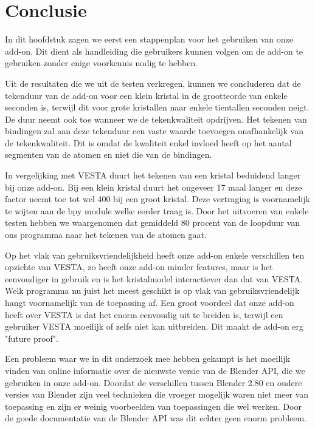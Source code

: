 \section{Conclusie}
In dit hoofdstuk zagen we eerst een stappenplan voor het gebruiken van onze add-on. Dit dient als handleiding die gebruikers kunnen volgen om de add-on te gebruiken zonder enige voorkennis nodig te hebben. 
\par
Uit de resultaten die we uit de testen verkregen, kunnen we concluderen dat de tekenduur van de add-on voor een klein kristal in de grootteorde van enkele seconden is, terwijl dit voor grote kristallen naar enkele tientallen seconden neigt. De duur neemt ook toe wanneer we de tekenkwaliteit opdrijven. Het tekenen van bindingen zal aan deze tekenduur een vaste waarde toevoegen onafhankelijk van de tekenkwaliteit. Dit is omdat de kwaliteit enkel invloed heeft op het aantal segmenten van de atomen en niet die van de bindingen.
\par    
In vergelijking met VESTA duurt het tekenen van een kristal beduidend langer bij onze add-on. Bij een klein kristal duurt het ongeveer 17 maal langer en deze factor neemt toe tot wel 400 bij een groot kristal. Deze vertraging is voornamelijk te wijten aan de bpy module welke eerder traag is. Door het uitvoeren van enkele testen hebben we waargenomen dat gemiddeld 80 procent van de loopduur van ons programma naar het tekenen van de atomen gaat. 
\par
Op het vlak van gebruiksvriendelijkheid heeft onze add-on enkele verschillen ten opzichte van VESTA, zo heeft onze add-on minder features, maar is het eenvoudiger in gebruik en is het kristalmodel interactiever dan dat van VESTA. Welk programma nu juist het meest geschikt is op vlak van gebruiksvriendelijk hangt voornamelijk van de toepassing af. Een groot voordeel dat onze add-on heeft over VESTA is dat het enorm eenvoudig uit te breiden is, terwijl een gebruiker VESTA moeilijk of zelfs niet kan uitbreiden. Dit maakt de add-on erg "future proof".
\par 
Een probleem waar we in dit onderzoek mee hebben gekampt is het moeilijk vinden van online informatie over de nieuwste versie van de Blender API, die we gebruiken in onze add-on. Doordat de verschillen tussen Blender 2.80 en oudere versies van Blender zijn veel technieken die vroeger mogelijk waren niet meer van toepassing en zijn er weinig voorbeelden van toepassingen die wel werken. Door de goede documentatie van de Blender API was dit echter geen enorm probleem.
\par
